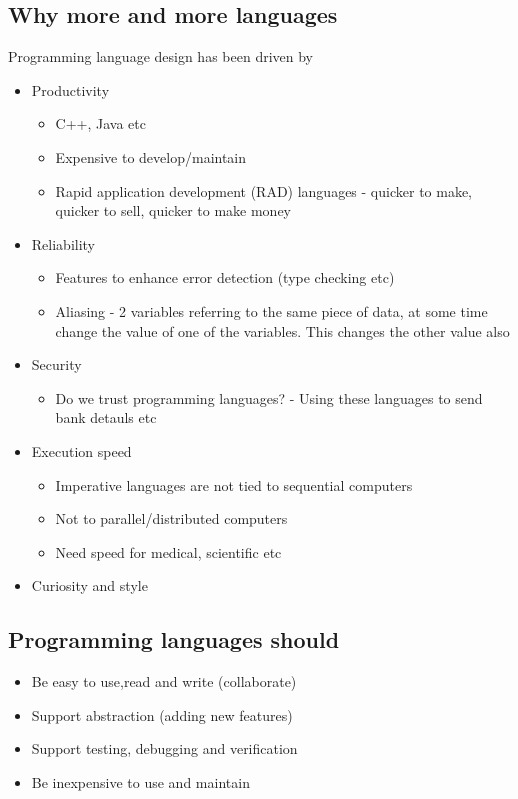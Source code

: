 \documentclass{article}[18pt]
\begin{document}
\subsection{Why more and more languages}
Programming language design has been driven by
\begin{itemize}
\item Productivity
\begin{itemize}
\item C++, Java etc
\item Expensive to develop/maintain
\item Rapid application development (RAD) languages - quicker to make, quicker to sell, quicker to make money
\end{itemize}
\item Reliability 
\begin{itemize}
\item Features to enhance error detection (type checking etc)
\item Aliasing - 2 variables referring to the same piece of data, at some time change the value of one of the variables. This changes the other value also
\end{itemize}
\item Security
\begin{itemize}
\item Do we trust programming languages? - Using these languages to send bank detauls etc
\end{itemize}
\item Execution speed
\begin{itemize}
\item Imperative languages are not tied to sequential computers
\item Not to parallel/distributed computers
\item Need speed for medical, scientific etc
\end{itemize}
\item Curiosity and style
\end{itemize}
\subsection{Programming languages should}
\begin{itemize}
\item Be easy to use,read and write (collaborate)
\item Support abstraction (adding new features)
\item Support testing, debugging and verification
\item Be inexpensive to use and maintain
\end{itemize}
\end{document}
